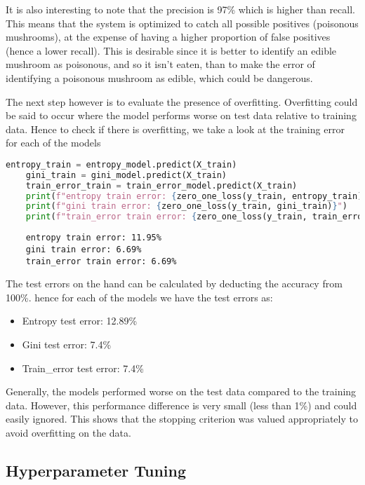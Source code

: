 \documentclass{article}
\begin{document}
It is also interesting to note that the precision is 97\% which is higher than recall. This means that the system is optimized to catch all possible positives (poisonous mushrooms), at the expense of having a higher proportion of false positives (hence a lower recall). This is desirable since it is better to identify an edible mushroom as poisonous, and so it isn't eaten, than to make the error of identifying a poisonous mushroom as edible, which could be dangerous. 

The next step however is to evaluate the presence of overfitting. Overfitting could be said to occur where the model performs worse on test data relative to training data. Hence to check if there is overfitting, we take a look at the training error for each of the models 

\begin{lstlisting}[language=Python, caption=Evaluating training errors]
    entropy_train = entropy_model.predict(X_train)
    gini_train = gini_model.predict(X_train)
    train_error_train = train_error_model.predict(X_train)
    print(f"entropy train error: {zero_one_loss(y_train, entropy_train)}")
    print(f"gini train error: {zero_one_loss(y_train, gini_train)}")
    print(f"train_error train error: {zero_one_loss(y_train, train_error_train)}")
\end{lstlisting}

\begin{lstlisting}
    entropy train error: 11.95%
    gini train error: 6.69%
    train_error train error: 6.69%
\end{lstlisting}

The test errors on the hand can be calculated by deducting the accuracy from 100\%. hence for each of the models we have the test errors as:

\begin{itemize}
    \item Entropy test error: 12.89\%
    \item Gini test error: 7.4\%
    \item Train\_error test error: 7.4\%
\end{itemize}

Generally, the models performed worse on the test data compared to the training data. However, this performance difference is very small (less than 1\%) and could easily ignored. This shows that the stopping criterion was valued appropriately to avoid overfitting on the data.

\subsection{Hyperparameter Tuning}
\end{document}
